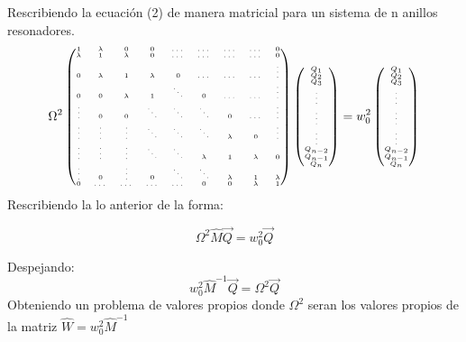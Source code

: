 \documentclass[11pt,letterpaper,twocolumn]{article}
\begin{document}
Rescribiendo la ecuación (2) de manera matricial para un sistema de n anillos resonadores.
$$
{\fontsize{5}{5}\selectfont 
{ { \Omega  } }^{ 2 }\begin{pmatrix} 1 & \lambda  & 0 & 0 & \dots  & \dots  & \dots  & \dots  & 0 \\ \lambda  & 1 & \lambda  & 0 & \dots  & \dots  & \dots  & \dots  & 0 \\ 0 & \lambda  & 1 & \lambda  & 0 & \dots  & \dots  & \dots  & \vdots  \\ 0 & 0 & \lambda  & 1 & \ddots  & 0 & \dots  & \dots  & \vdots  \\ \vdots  & 0 & 0 & \ddots  & \ddots  & \ddots  & 0 & \dots  & \vdots  \\ \vdots  & \vdots  & \vdots  & \ddots  & \ddots  & \ddots  & \lambda  & 0 & \vdots  \\ \vdots  & \vdots  & \vdots  & \ddots  & \ddots  & \lambda  & 1 & \lambda  & 0 \\ \vdots  & 0 & \vdots  & 0 & \ddots  & \ddots  & \lambda  & 1 & \lambda  \\ 0 & \dots  & \dots  & \dots  & \dots  & 0 & 0 & \lambda  & 1 \end{pmatrix}\begin{pmatrix} { Q }_{ 1 } \\ { Q }_{ 2 } \\ { Q }_{ 3 } \\ \vdots  \\ \vdots  \\ \vdots  \\ { Q }_{ n-2 } \\ { Q }_{ n-1 } \\ { Q }_{ n } \end{pmatrix}={ w }_{ 0 }^{ 2 }\begin{pmatrix} { Q }_{ 1 } \\ { Q }_{ 2 } \\ { Q }_{ 3 } \\ \vdots  \\ \vdots  \\ \vdots  \\ { Q }_{ n-2 } \\ { Q }_{ n-1 } \\ { Q }_{ n } \end{pmatrix}
}
$$
Rescribiendo la lo anterior de la forma:

$${ { \Omega  } }^{ 2 }\widehat { M } \overrightarrow { Q } ={ w }_{ 0 }^{ 2 }\overrightarrow { Q } $$

Despejando:
$${ w }_{ 0 }^{ 2 }\widehat {{ M }}^{-1} \overrightarrow { Q } ={ \Omega  }^{ 2 }\overrightarrow { Q } $$
Obteniendo un problema de valores propios donde $\Omega^{2}$ seran los valores propios de la matriz $\widehat{W}=w_{0}^{2} \widehat{M}^{-1}$
\end{document}
